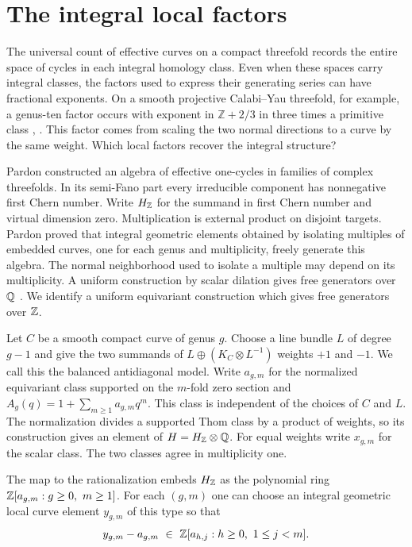 \section{The integral local factors}\label{sec:intro}

The universal count of effective curves on a compact threefold records
the entire space of cycles in each integral homology class. Even when
these spaces carry integral classes, the factors used to express their
generating series can have fractional exponents. On a smooth projective
Calabi--Yau threefold, for example, a genus-ten factor occurs with
exponent in $\mathbb Z+2/3$ in three times a primitive class
\cite[Theorem~1.1]{WueCounter}, \cite[Theorem~1.2]{WueTriples}. This factor comes from scaling the two
normal directions to a curve by the same weight. Which local factors
recover the integral structure?

Pardon constructed an algebra of effective one-cycles in families of
complex threefolds. In its semi-Fano part every irreducible component
has nonnegative first Chern number. Write $H_{\mathbb Z}$ for the summand
in first Chern number and virtual dimension zero. Multiplication is
external product on disjoint targets. Pardon proved that integral
geometric elements obtained by isolating multiples of embedded curves,
one for each genus and multiplicity, freely generate this algebra.
The normal neighborhood used to isolate a multiple may depend on its
multiplicity. A uniform construction by scalar dilation gives free
generators over $\mathbb Q$ \cite[Theorem~1.2]{Pardon}. We identify a uniform
equivariant construction which gives free generators over $\mathbb Z$.

Let $C$ be a smooth compact curve of genus $g$. Choose a line bundle
$L$ of degree $g-1$ and give the two summands of
$L\oplus(K_C\otimes L^{-1})$ weights $+1$ and $-1$. We call this
the balanced antidiagonal model. Write $a_{g,m}$ for the normalized
equivariant class supported on the $m$-fold zero section and
$A_g(q)=1+\sum_{m\ge1}a_{g,m}q^m$. This class is independent of the
choices of $C$ and $L$. The normalization divides a supported Thom
class by a product of weights, so its construction gives an element of
$H=H_{\mathbb Z}\otimes\mathbb Q$. For equal weights write $x_{g,m}$ for the scalar
class. The two classes agree in multiplicity one.

\begin{theorem}\label{thm:basis}
The map to the rationalization embeds $H_{\mathbb Z}$ as the polynomial ring
$\ZZ[a_{g,m}:g\ge0,\ m\ge1]$. For each $(g,m)$ one can choose an
integral geometric local curve element $y_{g,m}$ of this type so that
\[
 y_{g,m}-a_{g,m}\ \in\ \ZZ[a_{h,j}:h\ge0,\ 1\le j<m].
\]
\end{theorem}

